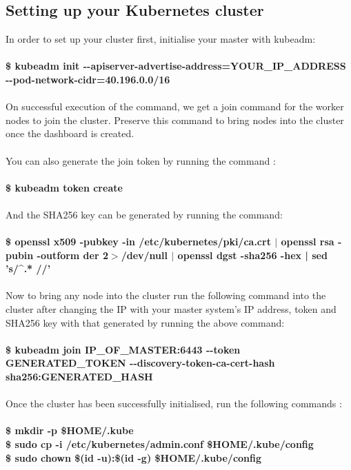 \documentclass[12pt]{article}
\begin{document}
\subsection{Setting up your Kubernetes cluster}
In order to set up your cluster first, initialise your master with kubeadm:\\\\
\textbf{\$ kubeadm init  -{}-apiserver-advertise-address=YOUR\_IP\_ADDRESS    -{}-pod-network-cidr=40.196.0.0/16}\\\\
On successful execution of the command, we get a join command for the worker nodes to join the cluster. Preserve this command to bring nodes into the cluster once the dashboard is created.\\\\
You can also generate the join token by running the command :\\\\
\textbf{\$ kubeadm token create}\\\\
And the SHA256 key can be generated by running the command:\\\\
\textbf{\$ openssl x509 -pubkey -in /etc/kubernetes/pki/ca.crt $|$ openssl rsa -pubin -outform der 2$>$/dev/null $|$ openssl dgst -sha256 -hex | sed 's/\string^.* //'}\\\\
Now to bring any node into the cluster run the following command into the cluster after changing the IP with your master system’s IP address, token and SHA256 key with that generated by running the above command:\\\\
\textbf{\$ kubeadm join IP\_OF\_MASTER:6443 -{}-token GENERATED\_TOKEN -{}-discovery-token-ca-cert-hash sha256:GENERATED\_HASH}\\\\
Once the cluster has been successfully initialised, run the following commands :\\\\
\textbf{
	\$ mkdir -p \$HOME/.kube\\
	\$ sudo cp -i /etc/kubernetes/admin.conf \$HOME/.kube/config\\
	\$ sudo chown \$(id -u):\$(id -g) \$HOME/.kube/config
}
\end{document}
